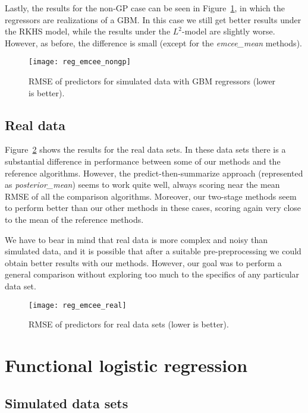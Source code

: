 Lastly, the results for the non-GP case can be seen in Figure~\ref{fig:reg_emcee_nongp}, in which the regressors are realizations of a GBM. In this case we still get better results under the RKHS model, while the results under the \(L^2\)-model are slightly worse. However, as before, the difference is small (except for the \textit{emcee\_mean} methods).

\begin{figure}[ht!]
  \centering
  \texttt{[image: reg\_emcee\_nongp]}
  \caption{RMSE of predictors for simulated data with GBM regressors (lower is better).}\label{fig:reg_emcee_nongp}
\end{figure}

\subsection*{Real data}

Figure~\ref{fig:reg_emcee_real} shows the results for the real data sets. In these data sets there is a substantial difference in performance between some of our methods and the reference algorithms. However, the predict-then-summarize approach (represented as \textit{posterior\_mean}) seems to work quite well, always scoring near the mean RMSE of all the comparison algorithms. Moreover, our two-stage methods seem to perform better than our other methods in these cases, scoring again very close to the mean of the reference methods.

We have to bear in mind that real data is more complex and noisy than simulated data, and it is possible that after a suitable pre-preprocessing we could obtain better results with our methods. However, our goal was to perform a general comparison without exploring too much to the specifics of any particular data set.

\begin{figure}[ht!]
  \centering
  \texttt{[image: reg\_emcee\_real]}
  \caption{RMSE of predictors for real data sets (lower is better).}\label{fig:reg_emcee_real}
\end{figure}

\section{Functional logistic regression}\label{sec:experiments-logistic}

\subsection*{Simulated data sets}

